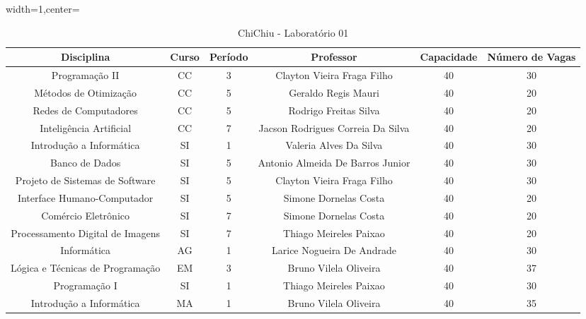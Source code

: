 \begin{apendices}
\begin{table}[!h]
\begin{adjustbox}{width=1\textwidth,center=\textwidth}
\centering
\begin{tabular}{|c|c|c|c|c|c|}
\hline
\textbf{Disciplina} & \textbf{Curso} & \textbf{Período} & \textbf{Professor} & \textbf{Capacidade} & \textbf{Número de Vagas} \\ \hline
Programação II & CC & 3 & Clayton Vieira Fraga Filho & 40 & 30 \\ \hline
Métodos de Otimização & CC & 5 & Geraldo Regis Mauri & 40 & 20 \\ \hline
Redes de Computadores & CC & 5 & Rodrigo Freitas Silva & 40 & 20 \\ \hline
Inteligência Artificial & CC & 7 & Jacson Rodrigues Correia Da Silva & 40 & 20 \\ \hline
Introdução a Informática & SI & 1 & Valeria Alves Da Silva & 40 & 30 \\ \hline
Banco de Dados & SI & 5 & Antonio Almeida De Barros Junior & 40 & 30 \\ \hline
Projeto de Sistemas de Software & SI & 5 & Clayton Vieira Fraga Filho & 40 & 30 \\ \hline
Interface Humano-Computador & SI & 5 & Simone Dornelas Costa & 40 & 20 \\ \hline
Comércio Eletrônico & SI & 7 & Simone Dornelas Costa & 40 & 20 \\ \hline
Processamento Digital de Imagens & SI & 7 & Thiago Meireles Paixao & 40 & 20 \\ \hline
Informática & AG & 1 & Larice Nogueira De Andrade & 40 & 30 \\ \hline
Lógica e Técnicas de Programação & EM & 3 & Bruno Vilela Oliveira & 40 & 37 \\ \hline
Programação I & SI & 1 & Thiago Meireles Paixao & 40 & 30 \\ \hline
Introdução a Informática & MA & 1 & Bruno Vilela Oliveira & 40 & 35 \\ \hline
\end{tabular}
\end{adjustbox}
\caption{ChiChiu - Laboratório 01}
\end{table}


\end{apendices}
